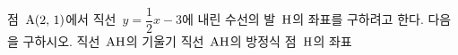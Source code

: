 점~$\mathrm{A}(2,\,1)$에서 직선~$y=\dfrac{1}{2}x-3$에 내린 수선의 발~$\mathrm{H}$의 좌표를 구하려고 한다. 다음을 구하시오.
 직선~$\mathrm{AH}$의 기울기
 직선~$\mathrm{AH}$의 방정식
 점~$\mathrm{H}$의 좌표
